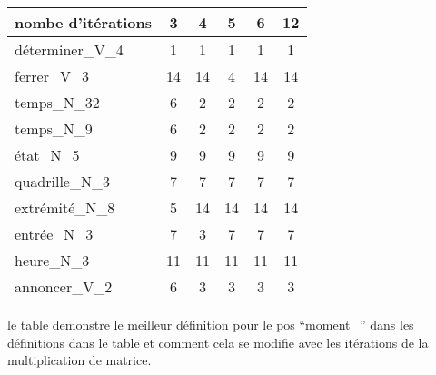 \begin{tabular}{|l|c|c|c|c|c|}
\hline
nombe d'itérations & 3  & 4  & 5  & 6  & 12 \\
\hline
déterminer\_V\_4   & 1  & 1  & 1  & 1  & 1  \\
ferrer\_V\_3       & 14 & 14 & 4  & 14 & 14 \\
temps\_N\_32       & 6  & 2  & 2  & 2  & 2  \\
temps\_N\_9        & 6  & 2  & 2  & 2  & 2  \\
état\_N\_5         & 9  & 9  & 9  & 9  & 9  \\
quadrille\_N\_3    & 7  & 7  & 7  & 7  & 7  \\
extrémité\_N\_8    & 5  & 14 & 14 & 14 & 14 \\
entrée\_N\_3       & 7  & 3  & 7  & 7  & 7  \\
heure\_N\_3        & 11 & 11 & 11 & 11 & 11 \\
annoncer\_V\_2     & 6  & 3  & 3  & 3  & 3  \\
\hline
\end{tabular}

le table demonstre le meilleur définition pour le pos ``moment\_''
dans les définitions dans le table et comment cela se modifie avec
les itérations de la multiplication de matrice.
